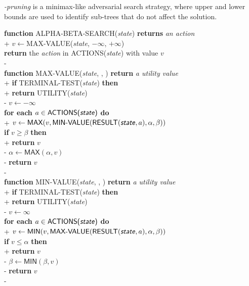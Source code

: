 \documentclass{article}
\begin{document}
\begin{definition}
    \emph{\alpha-\beta pruning} is a minimax-like adversarial search
    strategy, where upper and lower bounds are used to identify
    sub-trees that do not affect the solution.
    \begin{pseudo}
        \textbf{function} ALPHA-BETA-SEARCH(\emph{state}) \textbf{returns} \emph{an action}\\+
            $v\leftarrow$MAX-VALUE(\emph{state}, $-\infty$, $+\infty$)\\
            \textbf{return} the \emph{action} in ACTIONS(\emph{state}) with value $v$\\-
        \\
        \textbf{function} MAX-VALUE(\emph{state}, \alpha, \beta) \textbf{return} \emph{a utility value}\\+
            \textbf{if} TERMINAL-TEST(\emph{state}) \textbf{then}\\+
                \textbf{return} UTILITY(\emph{state})\\-
            $v\leftarrow-\infty$\\
            \textbf{for each} $a\in\textsf{ACTIONS(\emph{state})}$ \textbf{do}\\+
                $v\leftarrow \textsf{MAX}(v, \textsf{MIN-VALUE}(\textsf{RESULT}(\textsf{\emph{state}}, a), \alpha, \beta))$\\
                \textbf{if} $v\geq \beta$ \textbf{then}\\+
                    \textbf{return} $v$\\-
                $\alpha\leftarrow\textsf{MAX}(\alpha, v)$\\-
            \textbf{return} $v$\\-
        \\
        \textbf{function} MIN-VALUE(\emph{state}, \alpha, \beta) \textbf{return} \emph{a utility value}\\+
            \textbf{if} TERMINAL-TEST(\emph{state}) \textbf{then}\\+
                \textbf{return} UTILITY(\emph{state})\\-
            $v\leftarrow\infty$\\
            \textbf{for each} $a\in\textsf{ACTIONS(\emph{state})}$ \textbf{do}\\+
                $v\leftarrow \textsf{MIN}(v, \textsf{MAX-VALUE}(\textsf{RESULT}(\textsf{\emph{state}}, a), \alpha, \beta))$\\
                \textbf{if} $v\leq \alpha$ \textbf{then}\\+
                    \textbf{return} $v$\\-
                $\beta\leftarrow\textsf{MIN}(\beta, v)$\\-
            \textbf{return} $v$\\-
    \end{pseudo}
\end{definition}
\end{document}
